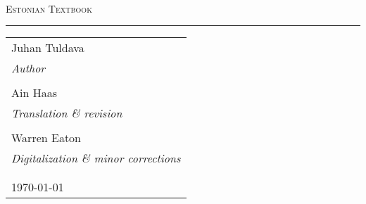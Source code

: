 \begin{titlepage}

~\\[2.5cm]

\begin{center}
\textsc{\Huge Estonian Textbook \\}
\noindent\rule{0.3\textwidth}{0.4mm}
\end{center}

\vfill

\begin{tabular}{ l }
{\large Juhan Tuldava} \\
\emph{Author} \\
\\
{\large Ain Haas} \\
\emph{Translation \& revision} \\
\\
{\large Warren Eaton} \\
\emph{Digitalization \& minor corrections} \\
\\
\\
{\large \today}
\end{tabular}


\end{titlepage}
